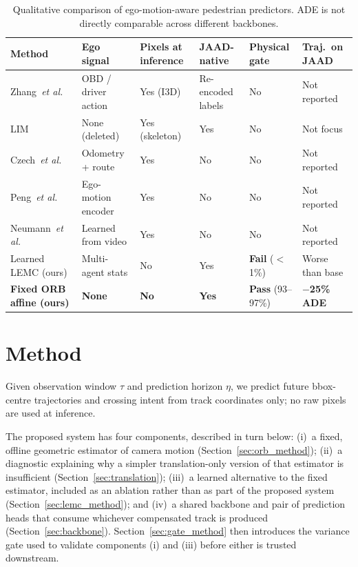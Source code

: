 \documentclass[conference]{IEEEtran}
\begin{document}
\begin{table}[!t]
\centering
\caption{Qualitative comparison of ego-motion-aware pedestrian predictors. ADE is not directly comparable across different backbones.}
\label{tab:compare}
\footnotesize
\setlength{\tabcolsep}{4pt}
\begin{tabularx}{\textwidth}{@{}l*{5}{>{\centering\arraybackslash}X}@{}}
\toprule
Method & Ego signal & Pixels at inference & JAAD-native & Physical gate & Traj.\ on JAAD \\
\midrule
Zhang~\textit{et al.}~\cite{zhang2024decouple} & OBD / driver action & Yes (I3D) & Re-encoded labels & No & Not reported \\
LIM~\cite{lim2025tits} & None (deleted) & Yes (skeleton) & Yes & No & Not focus \\
Czech~\textit{et al.}~\cite{czech2023behavior} & Odometry + route & Yes & No & No & Not reported \\
Peng~\textit{et al.}~\cite{peng2026trajmamba} & Ego-motion encoder & Yes & No & No & Not reported \\
Neumann~\textit{et al.}~\cite{neumann2021pedestrian} & Learned from video & Yes & No & No & Not reported \\
Learned LEMC (ours) & Multi-agent stats & No & Yes & \textbf{Fail} ($<$1\%) & Worse than base \\
\textbf{Fixed ORB affine (ours)} & \textbf{None} & \textbf{No} & \textbf{Yes} & \textbf{Pass} (93--97\%) & \textbf{$-$25\% ADE} \\
\bottomrule
\end{tabularx}
\end{table}
\FloatBarrier

\section{Method}
\label{sec:method}
Given observation window $\tau$ and prediction horizon $\eta$, we predict future bbox-centre trajectories and crossing intent from track coordinates only; no raw pixels are used at inference.

The proposed system has four components, described in turn below: (i)~a fixed, offline geometric estimator of camera motion (Section~\ref{sec:orb_method}); (ii)~a diagnostic explaining why a simpler translation-only version of that estimator is insufficient (Section~\ref{sec:translation}); (iii)~a learned alternative to the fixed estimator, included as an ablation rather than as part of the proposed system (Section~\ref{sec:lemc_method}); and (iv)~a shared backbone and pair of prediction heads that consume whichever compensated track is produced (Section~\ref{sec:backbone}). Section~\ref{sec:gate_method} then introduces the variance gate used to validate components (i) and (iii) before either is trusted downstream.
\end{document}
